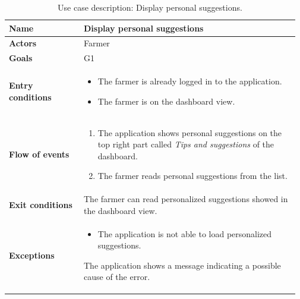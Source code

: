 \begin{table}[H]
    \centering
	\begin{tabular}{@{}p{0.25\linewidth} p{0.72\linewidth}@{}}
\toprule
		\textbf{Name}               & Display personal suggestions\\
		\midrule
		\textbf{Actors}             & Farmer\\
		\midrule
		\textbf{Goals}              & G1 \\
		\midrule
		
		\textbf{Entry conditions}   & \begin{itemize}[leftmargin=.4cm,noitemsep,topsep=0pt,before=\vspace{-3mm},after=\vspace{-4mm}]
		    \item The farmer is already logged in to the application.
		    \item The farmer is on the dashboard view.
		\end{itemize}\\
		\midrule
		
		\textbf{Flow of events}     & \begin{enumerate}[leftmargin=.4cm,noitemsep,topsep=0pt,before=\vspace{-3mm},after=\vspace{-4mm}]
		    \item The application shows personal suggestions on the top right part called \textit{Tips and suggestions} of the dashboard.
		    \item The farmer reads personal suggestions from the list.
		\end{enumerate}\\
		\midrule
		\textbf{Exit conditions}    & The farmer can read personalized suggestions showed in the dashboard view. \\
		\midrule
		
		\textbf{Exceptions}         & 
	    \begin{itemize}[leftmargin=.4cm,noitemsep,topsep=0pt,before=\vspace{-3mm}]
		   \item The application is not able to load personalized suggestions.
		\end{itemize}
		The application shows a message indicating a possible cause of the error.
		\\\bottomrule
	\end{tabular}
	\caption{Use case description: Display personal suggestions.} 
\end{table}


